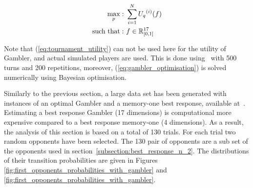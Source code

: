 \begin{equation}\label{eq:gambler_optimisation}
    \begin{aligned}
    \max_p: & \ \sum_{i=1} ^ {N} {U_q}^{(i)} (f)
    \\
    \text{such that}: & \ f \in \mathbb{R}_{[0, 1]}^{17}
    \end{aligned}
\end{equation}

Note that (\ref{eq:tournament_utility}) can not be used here for the utility
of Gambler, and actual simulated players are used. This is done using~\cite{axelrodproject}
with 500 turns and 200 repetitions, moreover, (\ref{eq:gambler_optimisation})
is solved numerically using Bayesian optimisation.

Similarly to the previous section, a large data set has been generated with
instances of an optimal Gambler and a memory-one best response, available
at~\cite{glynatsi2019}. Estimating a best response Gambler (17 dimensions) is
computational more expensive compared to a best response memory-one (4
dimensions). As a result, the analysis of this section is based on a total of
130 trials. For each trial two random opponents have been selected. The 130 pair
of opponents are a sub set of the opponents used in
section~\ref{subsection:best_response_n_2}. The distributions of their
transition probabilities are given in Figures
\ref{fig:first_opponents_probabilities_with_gambler} and
\ref{fig:first_opponents_probabilities_with_gambler}.

